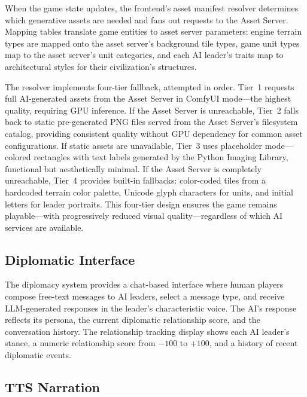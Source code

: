 \documentclass[conference]{IEEEtran}
\begin{document}
When the game state updates, the frontend's asset manifest resolver
determines which generative assets are needed and fans out requests to the
Asset Server. Mapping tables translate game entities to asset server
parameters: engine terrain types are mapped onto the asset server's background
tile types, game unit types map to the asset server's unit categories, and each AI
leader's traits map to architectural styles for their civilization's
structures.

The resolver implements four-tier fallback, attempted in order. Tier~1
requests full AI-generated assets from the Asset Server in ComfyUI
mode---the highest quality, requiring GPU inference. If the Asset Server
is unreachable, Tier~2 falls back to static pre-generated PNG files served
from the Asset Server's filesystem catalog, providing consistent quality
without GPU dependency for common asset configurations. If static assets are unavailable, Tier~3 uses
placeholder mode---colored rectangles with text labels generated by the
Python Imaging Library, functional but aesthetically minimal. If the Asset
Server is completely unreachable, Tier~4 provides built-in fallbacks:
color-coded tiles from a hardcoded terrain color palette, Unicode glyph
characters for units, and initial letters for leader portraits. This
four-tier design ensures the game remains playable---with progressively
reduced visual quality---regardless of which AI services are available.

\subsection{Diplomatic Interface}

The diplomacy system provides a chat-based interface where human players
compose free-text messages to AI leaders, select a message type, and
receive LLM-generated responses in the leader's characteristic voice. The
AI's response reflects its persona, the current diplomatic relationship
score, and the conversation history. The relationship tracking display
shows each AI leader's stance, a numeric relationship score from $-100$ to
$+100$, and a history of recent diplomatic events.

\subsection{TTS Narration}
\label{sec:tts}
\end{document}
